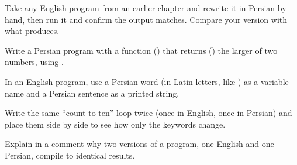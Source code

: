 \exercise Take any English program from an earlier chapter and rewrite it in
Persian by hand, then run it and confirm the output matches. Compare your version
with what  produces.

\exercise Write a Persian program with a function () that returns
() the larger of two numbers, using .

\exercise In an English program, use a Persian word (in Latin letters, like
) as a variable name and a Persian sentence as a printed string.

\exercise Write the same ``count to ten'' loop twice (once in English, once in
Persian) and place them side by side to see how only the keywords change.

\exercise Explain in a comment why two versions of a program, one English and one
Persian, compile to identical results.
